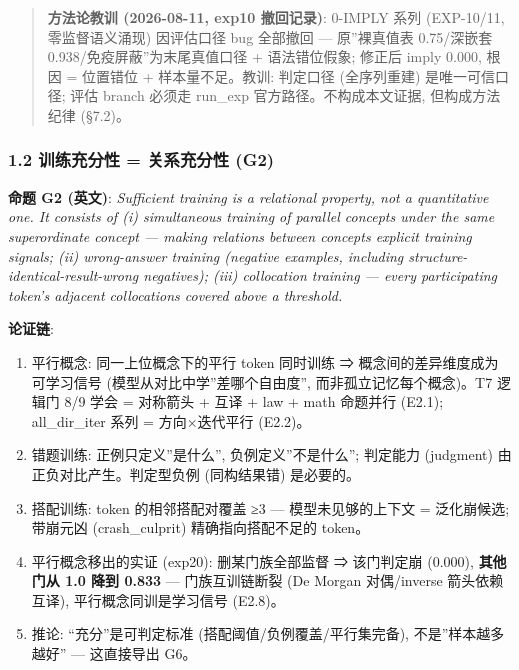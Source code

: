 \documentclass[
]{article}
\providecommand{\tightlist}{%
  \setlength{\itemsep}{0pt}\setlength{\parskip}{0pt}}
\begin{document}
\begin{quote}
\textbf{方法论教训 (2026-08-11, exp10 撤回记录)}: 0-IMPLY 系列
(EXP-10/11, 零监督语义涌现) 因评估口径 bug 全部撤回 --- 原''裸真值表
0.75/深嵌套 0.938/免疫屏蔽''为末尾真值口径 + 语法错位假象; 修正后 imply
0.000, 根因 = 位置错位 + 样本量不足。教训: 判定口径 (全序列重建)
是唯一可信口径; 评估 branch 必须走 run\_exp 官方路径。不构成本文证据,
但构成方法纪律 (§7.2)。
\end{quote}

\subsubsection{1.2 训练充分性 = 关系充分性
(G2)}\label{ux8badux7ec3ux5145ux5206ux6027-ux5173ux7cfbux5145ux5206ux6027-g2}

\textbf{命题 G2 (英文)}: \emph{Sufficient training is a relational
property, not a quantitative one. It consists of (i) simultaneous
training of parallel concepts under the same superordinate concept ---
making relations between concepts explicit training signals; (ii)
wrong-answer training (negative examples, including
structure-identical-result-wrong negatives); (iii) collocation training
--- every participating token's adjacent collocations covered above a
threshold.}

\textbf{论证链}:

\begin{enumerate}
\def\labelenumi{\arabic{enumi}.}
\tightlist
\item
  平行概念: 同一上位概念下的平行 token 同时训练 ⇒
  概念间的差异维度成为可学习信号 (模型从对比中学''差哪个自由度'',
  而非孤立记忆每个概念)。T7 逻辑门 8/9 学会 = 对称箭头 + 互译 + law +
  math 命题并行 (E2.1); all\_dir\_iter 系列 = 方向×迭代平行 (E2.2)。
\item
  错题训练: 正例只定义''是什么'', 负例定义''不是什么''; 判定能力
  (judgment) 由正负对比产生。判定型负例 (同构结果错) 是必要的。
\item
  搭配训练: token 的相邻搭配对覆盖 ≥3 --- 模型未见够的上下文 =
  泛化崩候选; 带崩元凶 (crash\_culprit) 精确指向搭配不足的 token。
\item
  平行概念移出的实证 (exp20): 删某门族全部监督 ⇒ 该门判定崩 (0.000),
  \textbf{其他门从 1.0 降到 0.833} --- 门族互训链断裂 (De Morgan
  对偶/inverse 箭头依赖互译), 平行概念同训是学习信号 (E2.8)。
\item
  推论: ``充分''是可判定标准 (搭配阈值/负例覆盖/平行集完备),
  不是''样本越多越好'' --- 这直接导出 G6。
\end{enumerate}
\end{document}
